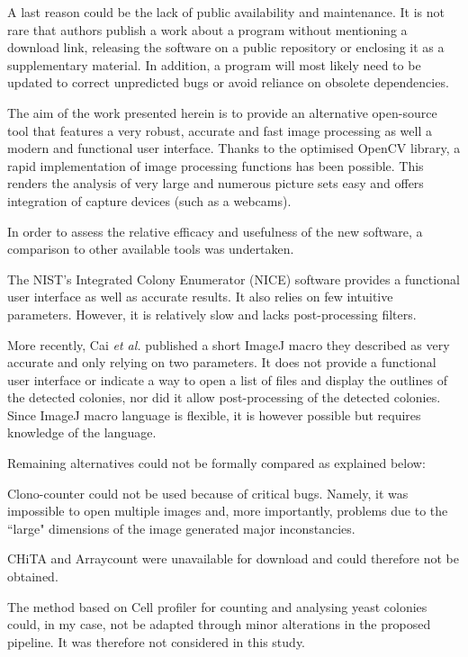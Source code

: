 \documentclass[10pt]{article}
\begin{document}
A last reason could be the lack of public availability
and maintenance. It is not rare that authors publish a work about a
program without mentioning a download link, releasing the software on a public
repository or enclosing it as a supplementary
material\cite{bewes_automated_2008,kachouie_arraycount_2009}.
In addition, a program will most likely need to be updated to correct
unpredicted bugs or avoid reliance on obsolete dependencies.

The aim of the work presented herein is to provide an alternative open-source tool that
features a very robust, accurate and fast image processing as well a modern and
functional user interface. Thanks to the optimised OpenCV
library\cite{opencv_library}, a rapid implementation of image processing
functions has been possible. This renders the analysis of very large and
numerous picture sets easy and offers integration of capture devices 
(such as a webcams). 

In order to assess the relative efficacy and usefulness of the new software,
a comparison to other available tools was undertaken.


The NIST's Integrated Colony Enumerator (NICE)\cite{clarke_lowcost_2010}
software provides a functional user interface as well as accurate results. It
also relies on few intuitive parameters. However, it is relatively slow and lacks
post-processing filters.

More recently, Cai \emph{et al.} published\cite{cai_optimized_2011} a short
ImageJ macro they described as very accurate and only relying on two parameters.
It does not provide a functional user interface or indicate a way to open a list
of files and display the outlines of the detected colonies, nor did it allow
post-processing of the detected colonies. Since ImageJ macro language is
flexible, it is however possible but requires knowledge of the language.

Remaining alternatives could not be formally compared as explained below:

Clono-counter\cite{niyazi_counting_2007} could not be used because of critical bugs.
Namely, it was impossible to open multiple images and, more importantly,
problems due to the ``large" dimensions of the image generated major inconstancies.

CHiTA\cite{bewes_automated_2008} and Arraycount\cite{kachouie_arraycount_2009}
were unavailable for download and could therefore not be obtained.

The method based on Cell profiler\cite {vokes_using_2008} for counting and
analysing yeast colonies could, in my case, not be adapted through minor
alterations in the proposed pipeline. It was therefore not considered in this study.
\end{document}

